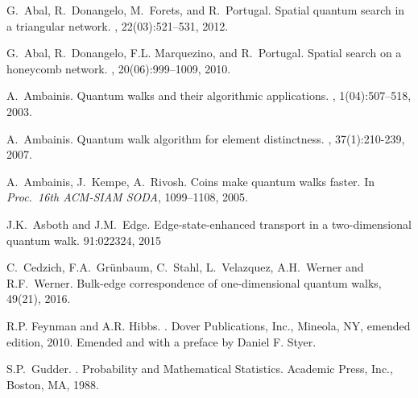 \documentclass[a4paper,12pt]{article}
\numberwithin{equation}{section}
\begin{document}
\begin{thebibliography}{99}

G.~Abal, R.~Donangelo, M.~Forets, and R.~Portugal.
\newblock Spatial quantum search in a triangular network.
, 22(03):521--531,
  2012.

G.~Abal, R.~Donangelo, F.L. Marquezino, and R.~Portugal.
\newblock Spatial search on a honeycomb network.
, 20(06):999--1009,
  2010.


A.~Ambainis.
\newblock Quantum walks and their algorithmic applications.
, 1(04):507--518,  2003.

A.~Ambainis.
\newblock Quantum walk algorithm for element distinctness.
, 37(1):210-239, 2007.

A.~Ambainis, J.~Kempe, A.~Rivosh.
\newblock Coins make quantum walks faster. 
\newblock In {\em Proc.~16th ACM-SIAM SODA}, 1099--1108, 2005. 

J.K.~Asboth and J.M.~Edge.
\newblock Edge-state-enhanced transport in a two-dimensional quantum walk.
 91:022324, 2015

C.~Cedzich, F.A.~Gr\"{u}nbaum, C.~Stahl, L.~Velazquez, A.H.~Werner and R.F.~Werner.
\newblock Bulk-edge correspondence of one-dimensional quantum walks,
 49(21), 2016.

R.P. Feynman and A.R. Hibbs.
.
\newblock Dover Publications, Inc., Mineola, NY, emended edition, 2010.
\newblock Emended and with a preface by Daniel F. Styer.

S.P.~Gudder.
.
\newblock Probability and Mathematical Statistics. Academic Press, Inc.,
  Boston, MA, 1988.


\end{thebibliography}
\end{document}
